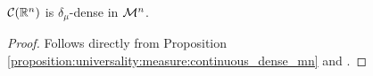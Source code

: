 \begin{corollary}
\label{corollary:universality:measure:continuous_dense_mn}
$\mathcal{C}({\mathbb R}^n)$ is $\delta_\mu$-dense in ${\mathcal M}^n$.
\end{corollary}
\begin{proof}
Follows directly from Proposition \ref{proposition:universality:measure:continuous_dense_mn} and .
\end{proof}

